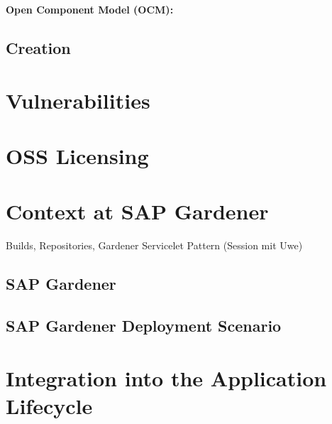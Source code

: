 \noindent
\textbf{Open Component Model (OCM):}\\

\subsection{Creation}



\section{Vulnerabilities}
\section{OSS Licensing}
\section{Context at SAP Gardener}
Builds, Repositories, Gardener Servicelet Pattern (Session mit Uwe)
\subsection{SAP Gardener}
\subsection{SAP Gardener Deployment Scenario}
\section{Integration into the Application Lifecycle}